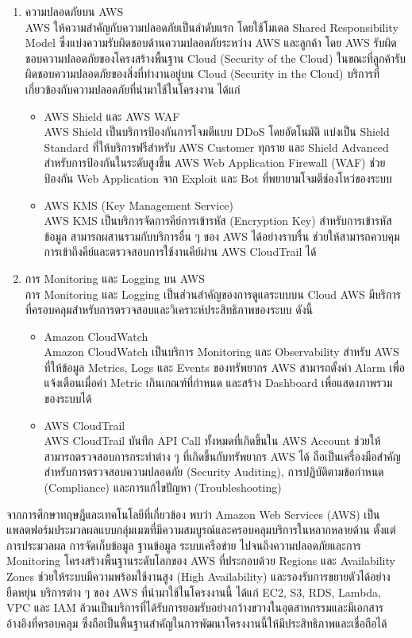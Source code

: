 \begin{itemize}
\begin{enumerate}
        \item ความปลอดภัยบน AWS \\
        AWS ให้ความสำคัญกับความปลอดภัยเป็นลำดับแรก โดยใช้โมเดล Shared Responsibility Model ซึ่งแบ่งความรับผิดชอบด้านความปลอดภัยระหว่าง AWS และลูกค้า โดย AWS รับผิดชอบความปลอดภัยของโครงสร้างพื้นฐาน Cloud (Security of the Cloud) ในขณะที่ลูกค้ารับผิดชอบความปลอดภัยของสิ่งที่ทำงานอยู่บน Cloud (Security in the Cloud) บริการที่เกี่ยวข้องกับความปลอดภัยที่นำมาใช้ในโครงงาน ได้แก่
\begin{itemize}
    \item AWS Shield และ AWS WAF\\
         AWS Shield เป็นบริการป้องกันการโจมตีแบบ DDoS โดยอัตโนมัติ แบ่งเป็น Shield Standard ที่ให้บริการฟรีสำหรับ AWS Customer ทุกราย และ Shield Advanced สำหรับการป้องกันในระดับสูงขึ้น AWS Web Application Firewall (WAF) ช่วยป้องกัน Web Application จาก Exploit และ Bot ที่พยายามโจมตีช่องโหว่ของระบบ
    \item AWS KMS (Key Management Service) \\
       AWS KMS เป็นบริการจัดการคีย์การเข้ารหัส (Encryption Key) สำหรับการเข้ารหัสข้อมูล สามารถผสานรวมกับบริการอื่น ๆ ของ AWS ได้อย่างราบรื่น ช่วยให้สามารถควบคุมการเข้าถึงคีย์และตรวจสอบการใช้งานคีย์ผ่าน AWS CloudTrail ได้
    \end{itemize}

        \item การ Monitoring และ Logging บน AWS \\
        การ Monitoring และ Logging เป็นส่วนสำคัญของการดูแลระบบบน Cloud AWS มีบริการที่ครอบคลุมสำหรับการตรวจสอบและวิเคราะห์ประสิทธิภาพของระบบ ดังนี้
    \begin{itemize}
    \item Amazon CloudWatch\\
         Amazon CloudWatch เป็นบริการ Monitoring และ Observability สำหรับ AWS ที่ให้ข้อมูล Metrics, Logs และ Events ของทรัพยากร AWS สามารถตั้งค่า Alarm เพื่อแจ้งเตือนเมื่อค่า Metric เกินเกณฑ์ที่กำหนด และสร้าง Dashboard เพื่อแสดงภาพรวมของระบบได้
    \item AWS CloudTrail \\
       AWS CloudTrail บันทึก API Call ทั้งหมดที่เกิดขึ้นใน AWS Account ช่วยให้สามารถตรวจสอบการกระทำต่าง ๆ ที่เกิดขึ้นกับทรัพยากร AWS ได้ ถือเป็นเครื่องมือสำคัญสำหรับการตรวจสอบความปลอดภัย (Security Auditing), การปฏิบัติตามข้อกำหนด (Compliance) และการแก้ไขปัญหา (Troubleshooting)
    \end{itemize}

    \end{enumerate}
    จากการศึกษาทฤษฎีและเทคโนโลยีที่เกี่ยวข้อง พบว่า Amazon Web Services (AWS) เป็นแพลตฟอร์มประมวลผลแบบกลุ่มเมฆที่มีความสมบูรณ์และครอบคลุมบริการในหลากหลายด้าน ตั้งแต่การประมวลผล การจัดเก็บข้อมูล ฐานข้อมูล ระบบเครือข่าย ไปจนถึงความปลอดภัยและการ Monitoring โครงสร้างพื้นฐานระดับโลกของ AWS ที่ประกอบด้วย Regions และ Availability Zones ช่วยให้ระบบมีความพร้อมใช้งานสูง (High Availability) และรองรับการขยายตัวได้อย่างยืดหยุ่น บริการต่าง ๆ ของ AWS ที่นำมาใช้ในโครงงานนี้ ได้แก่ EC2, S3, RDS, Lambda, VPC และ IAM ล้วนเป็นบริการที่ได้รับการยอมรับอย่างกว้างขวางในอุตสาหกรรมและมีเอกสารอ้างอิงที่ครอบคลุม ซึ่งถือเป็นพื้นฐานสำคัญในการพัฒนาโครงงานนี้ให้มีประสิทธิภาพและเชื่อถือได้

\end{itemize}